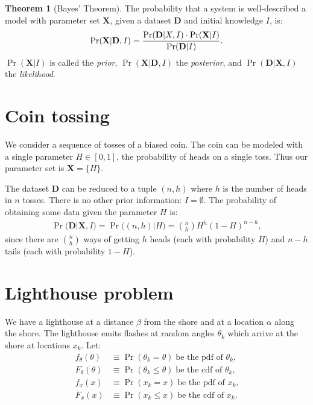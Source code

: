 \documentclass{article}
\renewcommand{\vec}{\mathbf}
\theoremstyle{definition}
\newtheorem*{thm}{Theorem}
\begin{document}
\begin{thm}[Bayes' Theorem]
The probability that a system is well-described a model with
parameter set $\vec X$, given a dataset $\vec D$ and initial knowledge
$I$, is:
\begin{align*}
\Pr(\vec X | \vec D, I) =
{
    \Pr(\vec D | X, I) \cdot \Pr(\vec X | I)
    \over
    \Pr(\vec D | I)
}.
\end{align*}
$\Pr(\vec X | I)$ is called the \emph{prior}, $\Pr(\vec X | \vec D, I)$
the \emph{posterior}, and $\Pr(\vec D | \vec X, I)$ the \emph{likelihood}.
\end{thm}

\section{Coin tossing}

We consider a sequence of tosses of a biased coin. The coin can be
modeled with a single parameter $H \in [0, 1]$, the probability of
heads on a single toss. Thus our parameter set is $\vec X = \{ H \}$.

The dataset $\vec D$ can be reduced to a tuple $(n, h)$ where $h$
is the number of heads in $n$ tosses. There is no other
prior information: $I = \emptyset$. The probability of obtaining
some data given the parameter $H$ is:
\begin{align*}
\Pr(\vec D | \vec X, I) = \Pr\Big( (n, h) | H \Big)
= {n \choose h} H^h (1 - H)^{n - h},
\end{align*}
since there are ${n \choose h}$ ways of getting $h$ heads (each
with probability $H$) and $n - h$ tails (each with probability
$1 - H$).

\section{Lighthouse problem}

We have a lighthouse at a distance $\beta$ from the shore and
at a location $\alpha$ along the shore. The lighthouse emits
flashes at random angles $\theta_k$ which arrive at the shore
at locations $x_k$.
Let:
\begin{align*}
f_\theta(\theta) &\equiv \Pr(\theta_k = \theta) \;\text{be the
pdf of $\theta_k$,} \\
F_\theta(\theta) &\equiv \Pr(\theta_k \le \theta) \;\text{be the
cdf of $\theta_k$,} \\
f_x(x) &\equiv \Pr(x_k = x) \;\text{be the
pdf of $x_k$,} \\
F_x(x) &\equiv \Pr(x_k \le x) \;\text{be the
cdf of $x_k$.}
\end{align*}
\end{document}
